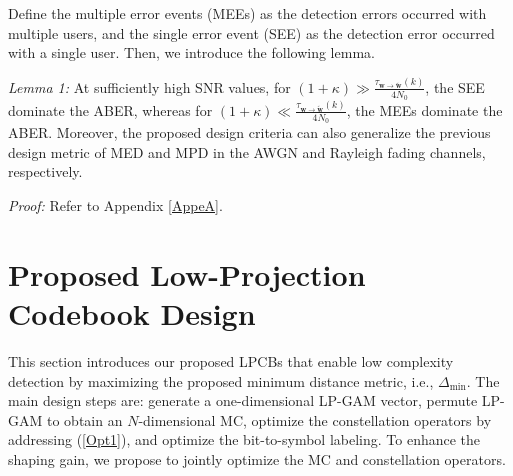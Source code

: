 \documentclass[journal]{IEEEtran}
\begin{document}
 Define the multiple error events (MEEs) as  the detection errors occurred with multiple users, and the  single error event (SEE) as  the detection error  occurred with a single user. Then, we   introduce the following lemma.

 {\textit{Lemma 1:}} At sufficiently  high SNR values, for $(1+\kappa) \gg \frac{ \tau _{{{\mathbf w}} \rightarrow {\tilde{\mathbf{w}}}}(k)  }{4N_0}$, the SEE  dominate the ABER, whereas  for $(1+\kappa) \ll \frac{ \tau _{{{\mathbf w}} \rightarrow {\tilde{\mathbf{w}}}}(k)  }{4N_0}$, the MEEs  dominate the ABER. Moreover,
the  proposed design criteria can also  generalize the    previous design  metric of MED and MPD in the AWGN and Rayleigh fading channels, respectively. 

\textit{ Proof:} Refer to Appendix \ref{AppeA}.


     
   
 

  

     


\section{Proposed Low-Projection  Codebook Design }
This section introduces our proposed LPCBs that enable  low complexity detection by maximizing the proposed  minimum distance metric, i.e., ${{\Delta}_{\min}}$.   The main design steps are: generate a one-dimensional LP-GAM vector, permute LP-GAM to obtain an $N$-dimensional MC, optimize the   constellation operators by addressing (\ref{Opt1}), and optimize the bit-to-symbol labeling.   To enhance the shaping gain, we propose to jointly optimize the MC and  constellation operators. 




\end{document}
